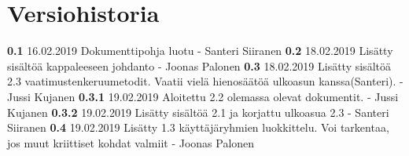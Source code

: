 \chapter*{Versiohistoria}

\newcommand{\currentversion}{0.4} %

\textbf{0.1} 16.02.2019 Dokumenttipohja luotu - Santeri Siiranen \newline
\textbf{0.2} 18.02.2019 Lisätty sisältöä kappaleeseen johdanto - Joonas Palonen \newline
\textbf{0.3} 18.02.2019 Lisätty sisältöä 2.3 vaatimustenkeruumetodit. Vaatii vielä hienosäätöä ulkoasun kanssa(Santeri). - Jussi Kujanen \newline
\textbf{0.3.1} 19.02.2019 Aloitettu 2.2 olemassa olevat dokumentit. - Jussi Kujanen \newline
\textbf{0.3.2} 19.02.2019 Lisätty sisältöä 2.1 ja korjattu ulkoasua 2.3 - Santeri Siiranen \newline
\textbf{0.4} 19.02.2019 Lisätty 1.3 käyttäjäryhmien luokkittelu. Voi tarkentaa, jos muut kriittiset kohdat valmiit - Joonas Palonen \newline

